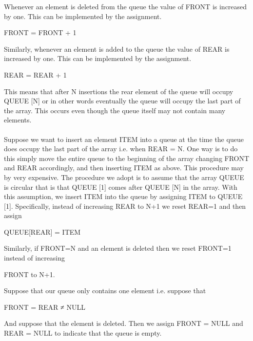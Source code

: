 \documentclass[11pt]{article}            %
\begin{document}
Whenever an element is deleted from the queue the value of FRONT is increased by one.
This can be implemented by the assignment.
\begin{center}	FRONT = FRONT + 1 \end{center}
Similarly, whenever an element is added to the queue the value of REAR is increased by
one. This can be implemented by the assignment.
\begin{center}		REAR = REAR + 1 \end{center}
This means that after N insertions the rear element of the queue will occupy QUEUE [N] or in
other words eventually the queue will occupy the last part of the array. This occurs even though
the queue itself may not contain many elements.\\~\\
Suppose we want to insert an element ITEM into a queue at the time the queue does occupy
the last part of the array i.e. when REAR = N. One way is to do this simply move the entire
queue to the beginning of the array changing FRONT and REAR accordingly, and then inserting
ITEM as above. This procedure may by very expensive. The procedure we adopt is to assume
that the array QUEUE is circular that is that QUEUE [1] comes after QUEUE [N] in the array.
With this assumption, we insert ITEM into the queue by assigning ITEM to QUEUE [1].
Specifically, instead of increasing REAR to N+1 we reset REAR=1 and then assign
\begin{center}	QUEUE[REAR] = ITEM \end{center}
Similarly, if FRONT=N and an element is deleted then we reset FRONT=1 instead of
increasing
\begin{center}		FRONT to N+1. \end{center}
Suppose that our queue only contains one element i.e. suppose that
\begin{center}	FRONT = REAR ≠ NULL \end{center}
And suppose that the element is deleted. Then we assign FRONT = NULL and REAR
= NULL to indicate that the queue is empty.\\~\\~\\
\end{document}

